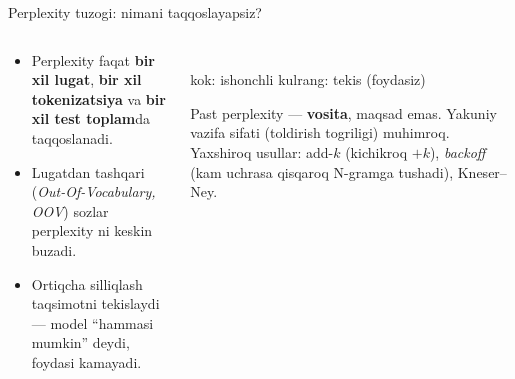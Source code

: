 \documentclass[aspectratio=169,11pt]{beamer}
\newcommand{\uzq}{\textquotesingle{}}
\begin{document}
\begin{frame}{Perplexity tuzog\uzq{}i: nimani taqqoslayapsiz?}
\footnotesize

\begin{columns}[T,totalwidth=\textwidth]
\begin{column}{0.52\textwidth}
\begin{tcolorbox}[warnbox,title=Cheklovlar,left=2mm,right=2mm,top=1mm,bottom=1mm]
\begin{itemize}\setlength\itemsep{3pt}
  \item Perplexity faqat \textbf{bir xil lug\uzq{}at}, \textbf{bir xil tokenizatsiya}
        va \textbf{bir xil test to\uzq{}plam}da taqqoslanadi.
  \item Lug\uzq{}atdan tashqari (\textit{Out-Of-Vocabulary, OOV}) so\uzq{}zlar
        perplexity ni keskin buzadi.
  \item Ortiqcha silliqlash taqsimotni tekislaydi --- model ``hammasi mumkin''
        deydi, foydasi kamayadi.
\end{itemize}
\end{tcolorbox}
\end{column}

\begin{column}{0.48\textwidth}
\centering
{}\\[-2pt]
{\scriptsize ko\uzq{}k: ishonchli \quad kulrang: tekis (foydasiz)}

\vspace{3pt}
\begin{tcolorbox}[okbox,left=2mm,right=2mm,top=1mm,bottom=1mm]
\scriptsize
Past perplexity --- \textbf{vosita}, maqsad emas. Yakuniy vazifa sifati
(to\uzq{}ldirish to\uzq{}g\uzq{}riligi) muhimroq. Yaxshiroq usullar: add-$k$
(kichikroq $+k$), \textit{backoff} (kam uchrasa qisqaroq N-gramga tushadi), Kneser--Ney.
\end{tcolorbox}
\end{column}
\end{columns}

\end{frame}
\end{document}
